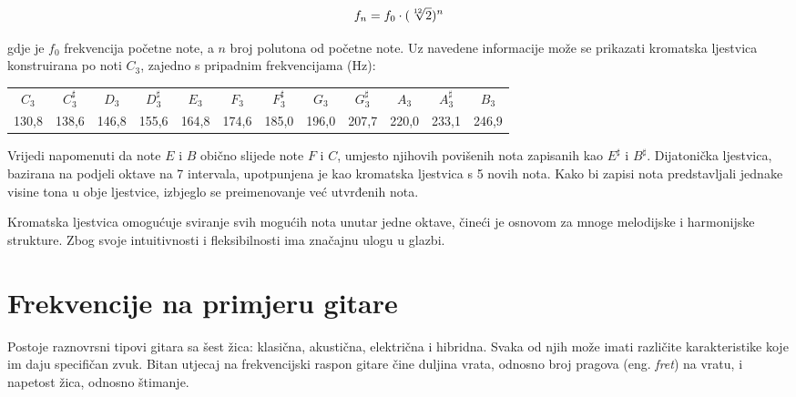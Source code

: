 \documentclass[times, utf8, diplomski, numeric]{fer}
\begin{document}
\begin{equation}
	f_n = f_0 \cdot (\sqrt[12]{2})^n\\
\end{equation}

gdje je $f_0$ frekvencija početne note, a $n$ broj polutona od početne note. Uz navedene informacije može se prikazati kromatska ljestvica konstruirana po noti $C_3$, zajedno s pripadnim frekvencijama (Hz):

\begin{center}
	\footnotesize
	\begin{tabular}{c c c c c c c c c c c c}
		$C_3$ & $C_3^\sharp$ & $D_3$ & $D_3^\sharp$ & $E_3$ & $F_3$ & $F_3^\sharp$ & $G_3$ & $G_3^\sharp$ & $A_3$ & $A_3^\sharp$ & $B_3$\\
		130,8 & 138,6 & 146,8 & 155,6 & 164,8 & 174,6 & 185,0 & 196,0 & 207,7 & 220,0 & 233,1 & 246,9\\
	\end{tabular}
\end{center}

Vrijedi napomenuti da note $E$ i $B$ obično slijede note $F$ i $C$, umjesto njihovih povišenih nota zapisanih kao $E^\sharp$ i $B^\sharp$. Dijatonička ljestvica, bazirana na podjeli oktave na 7 intervala, upotpunjena je kao kromatska ljestvica s 5 novih nota. Kako bi zapisi nota predstavljali jednake visine tona u obje ljestvice, izbjeglo se preimenovanje već utvrđenih nota.\cite{enciklopedijaDijatonikaHrvatska}

Kromatska ljestvica omogućuje sviranje svih mogućih nota unutar jedne oktave, čineći je osnovom za mnoge melodijske i harmonijske strukture. Zbog svoje intuitivnosti i fleksibilnosti ima značajnu ulogu u glazbi.
%

\chapter{Frekvencije na primjeru gitare}
Postoje raznovrsni tipovi gitara sa šest žica: klasična, akustična, električna i hibridna. Svaka od njih može imati različite karakteristike koje im daju specifičan zvuk. Bitan utjecaj na frekvencijski raspon gitare čine duljina vrata, odnosno broj pragova (eng. \textit{fret}) na vratu, i napetost žica, odnosno štimanje.
\end{document}
